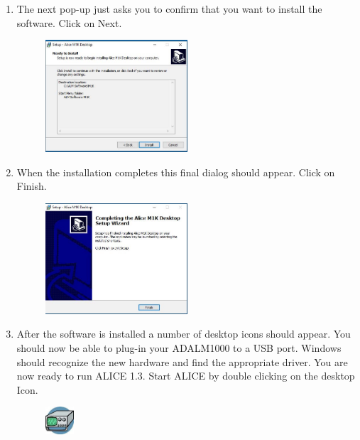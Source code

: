 \documentclass[12pt]{../manual}
\begin{document}
\begin{enumerate}
\begin{figure}[!ht]
\begin{center}
\end{center}
\end{figure}
\newpage
\item The next pop-up just asks you to confirm that you want to install the software. Click on Next.
\begin{figure}[!ht]
\begin{center}
\includegraphics[width=0.5\textwidth]{figures/Confirm}
\end{center}
\end{figure}
\item When the installation completes this final dialog should appear. Click on Finish.
\begin{figure}[!ht]
\begin{center}
\includegraphics[width=0.5\textwidth]{figures/Done}
\end{center}
\end{figure}
\item After the software is installed a number of desktop icons should appear. You should now be able to plug-in your ADALM1000 to a USB port. Windows should recognize the new hardware and find the appropriate driver.
You are now ready to run ALICE 1.3. Start ALICE by double clicking on the desktop Icon.
\begin{figure}[!ht]
\begin{center}
\includegraphics[width=0.1\textwidth]{figures/DesktopIcon}
\end{center}
\end{figure}
\end{enumerate}
\end{document}
